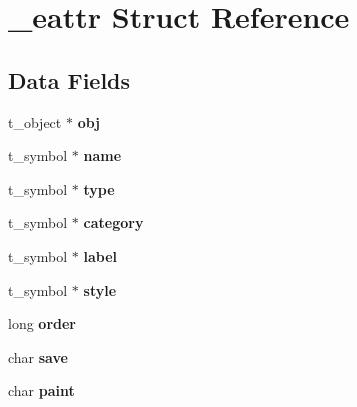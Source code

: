 \hypertarget{struct__eattr}{\section{\-\_\-eattr Struct Reference}
\label{struct__eattr}
}
\subsection*{Data Fields}
\begin{DoxyCompactItemize}
\item 
\hypertarget{struct__eattr_a064eb377293a7336941a89262bb4b70c}{t\-\_\-object $\ast$ {\bfseries obj}}\label{struct__eattr_a064eb377293a7336941a89262bb4b70c}

\item 
\hypertarget{struct__eattr_a6819488c01236bae4b115dcc15c27e95}{t\-\_\-symbol $\ast$ {\bfseries name}}\label{struct__eattr_a6819488c01236bae4b115dcc15c27e95}

\item 
\hypertarget{struct__eattr_a6e9f41f359f7588f11d1e2ab8c745599}{t\-\_\-symbol $\ast$ {\bfseries type}}\label{struct__eattr_a6e9f41f359f7588f11d1e2ab8c745599}

\item 
\hypertarget{struct__eattr_aa2c8c490a3fba46a31fbafcd739c63bc}{t\-\_\-symbol $\ast$ {\bfseries category}}\label{struct__eattr_aa2c8c490a3fba46a31fbafcd739c63bc}

\item 
\hypertarget{struct__eattr_a0e6a1d1c023e1e1ea182c7d1df964652}{t\-\_\-symbol $\ast$ {\bfseries label}}\label{struct__eattr_a0e6a1d1c023e1e1ea182c7d1df964652}

\item 
\hypertarget{struct__eattr_a3da6bc9b334bea21c7d24be105b852a6}{t\-\_\-symbol $\ast$ {\bfseries style}}\label{struct__eattr_a3da6bc9b334bea21c7d24be105b852a6}

\item 
\hypertarget{struct__eattr_a70328b614bd370f7e76d83b552e40d40}{long {\bfseries order}}\label{struct__eattr_a70328b614bd370f7e76d83b552e40d40}

\item 
\hypertarget{struct__eattr_ab22c2f8dadce0bba99b5f6563733e76c}{char {\bfseries save}}\label{struct__eattr_ab22c2f8dadce0bba99b5f6563733e76c}

\item 
\hypertarget{struct__eattr_ae736733d7739ef738d371dc929b731be}{char {\bfseries paint}}\label{struct__eattr_ae736733d7739ef738d371dc929b731be}


\end{DoxyCompactItemize}
